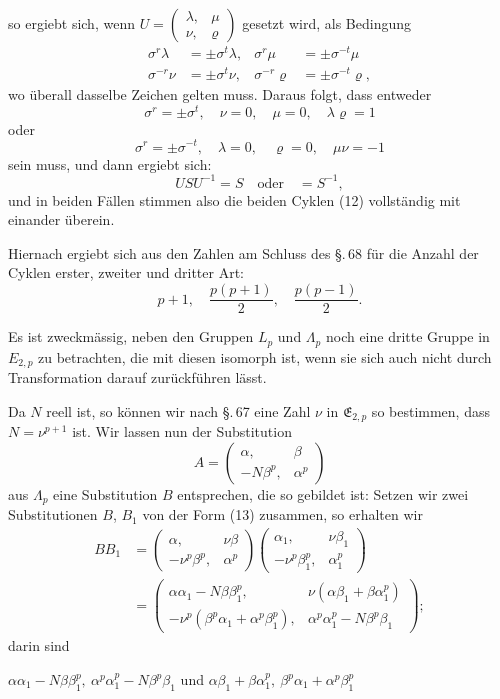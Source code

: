 so ergiebt sich, wenn $U = \begin{pmatrix}\lambda, & \mu\\ \nu, & \varrho\end{pmatrix}$ gesetzt wird, als Bedingung
\[
\begin{aligned}
\sigma^r\lambda &= \pm\sigma^t\lambda, & \sigma^r\mu &= \pm\sigma^{-t}\mu\\
\sigma^{-r}\nu &= \pm\sigma^t\nu, & \sigma^{-r}\varrho &= \pm\sigma^{-t}\varrho,
\end{aligned}
\]
wo überall dasselbe Zeichen gelten muss. Daraus folgt, dass entweder
\[
\sigma^r = \pm\sigma^t, \quad \nu = 0, \quad \mu = 0, \quad \lambda\varrho = 1
\]
oder
\[
\sigma^r = \pm\sigma^{-t}, \quad \lambda = 0, \quad \varrho = 0, \quad \mu\nu = -1
\]
sein muss, und dann ergiebt sich:
\[
USU^{-1} = S \quad \text{oder} \quad = S^{-1},
\]
und in beiden Fällen stimmen also die beiden Cyklen (12) vollständig mit einander überein.

Hiernach ergiebt sich aus den Zahlen am Schluss des \S.\,68 für die Anzahl der Cyklen erster, zweiter und dritter Art:
\[
p+1, \quad \frac{p(p+1)}{2}, \quad \frac{p(p-1)}{2}.
\]

Es ist zweckmässig, neben den Gruppen $L_p$ und $\Lambda_p$ noch eine dritte Gruppe in $E_{2,p}$ zu betrachten, die mit diesen isomorph ist, wenn sie sich auch nicht durch Transformation darauf zurückführen lässt.

Da $N$ reell ist, so können wir nach \S.\,67 eine Zahl $\nu$ in $\mathfrak{E}_{2,p}$ so bestimmen, dass $N = \nu^{p+1}$ ist. Wir lassen nun der Substitution
\[
A = \begin{pmatrix}\alpha, & \beta\\ -N\beta^p, & \alpha^p\end{pmatrix}
\]
aus $\Lambda_p$ eine Substitution $B$ entsprechen, die so gebildet ist:
Setzen wir zwei Substitutionen $B$, $B_1$ von der Form (13) zusammen, so erhalten wir
\[
\begin{aligned}
BB_1 &= \begin{pmatrix}\alpha, & \nu\beta\\ -\nu^p\beta^p, & \alpha^p\end{pmatrix}\begin{pmatrix}\alpha_1, & \nu\beta_1\\ -\nu^p\beta_1^p, & \alpha_1^p\end{pmatrix}\\
&= \begin{pmatrix}\alpha\alpha_1 - N\beta\beta_1^p, & \nu(\alpha\beta_1+\beta\alpha_1^p)\\ -\nu^p(\beta^p\alpha_1+\alpha^p\beta_1^p), & \alpha^p\alpha_1^p - N\beta^p\beta_1\end{pmatrix};
\end{aligned}
\]
darin sind

$\alpha\alpha_1 - N\beta\beta_1^p, \ \alpha^p\alpha_1^p - N\beta^p\beta_1$ und $\alpha\beta_1+\beta\alpha_1^p, \ \beta^p\alpha_1+\alpha^p\beta_1^p$
